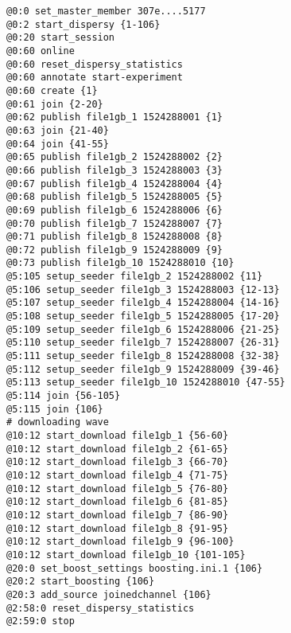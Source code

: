 \begin{appendices}
\begin{lstlisting}[caption={Scenario 2.}]
@0:0 set_master_member 307e....5177
@0:2 start_dispersy {1-106}
@0:20 start_session
@0:60 online
@0:60 reset_dispersy_statistics
@0:60 annotate start-experiment
@0:60 create {1}
@0:61 join {2-20}
@0:62 publish file1gb_1 1524288001 {1}
@0:63 join {21-40}
@0:64 join {41-55}
@0:65 publish file1gb_2 1524288002 {2}
@0:66 publish file1gb_3 1524288003 {3}
@0:67 publish file1gb_4 1524288004 {4}
@0:68 publish file1gb_5 1524288005 {5}
@0:69 publish file1gb_6 1524288006 {6}
@0:70 publish file1gb_7 1524288007 {7}
@0:71 publish file1gb_8 1524288008 {8}
@0:72 publish file1gb_9 1524288009 {9}
@0:73 publish file1gb_10 1524288010 {10}
@5:105 setup_seeder file1gb_2 1524288002 {11}
@5:106 setup_seeder file1gb_3 1524288003 {12-13}
@5:107 setup_seeder file1gb_4 1524288004 {14-16}
@5:108 setup_seeder file1gb_5 1524288005 {17-20}
@5:109 setup_seeder file1gb_6 1524288006 {21-25}
@5:110 setup_seeder file1gb_7 1524288007 {26-31}
@5:111 setup_seeder file1gb_8 1524288008 {32-38}
@5:112 setup_seeder file1gb_9 1524288009 {39-46}
@5:113 setup_seeder file1gb_10 1524288010 {47-55}
@5:114 join {56-105}
@5:115 join {106}
# downloading wave
@10:12 start_download file1gb_1 {56-60}
@10:12 start_download file1gb_2 {61-65}
@10:12 start_download file1gb_3 {66-70}
@10:12 start_download file1gb_4 {71-75}
@10:12 start_download file1gb_5 {76-80}
@10:12 start_download file1gb_6 {81-85}
@10:12 start_download file1gb_7 {86-90}
@10:12 start_download file1gb_8 {91-95}
@10:12 start_download file1gb_9 {96-100}
@10:12 start_download file1gb_10 {101-105}
@20:0 set_boost_settings boosting.ini.1 {106}
@20:2 start_boosting {106}
@20:3 add_source joinedchannel {106}
@2:58:0 reset_dispersy_statistics
@2:59:0 stop
\end{lstlisting}


\end{appendices}
